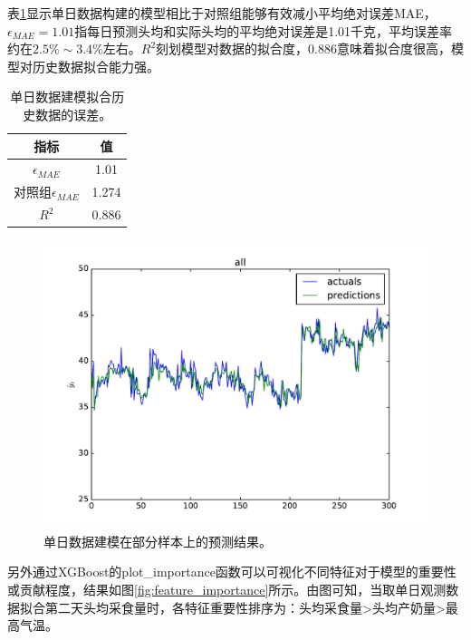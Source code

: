 表\ref{tab:singleday_all}显示单日数据构建的模型相比于对照组能够有效减小平均绝对误差MAE，$\epsilon_{MAE}=1.01$指每日预测头均和实际头均的平均绝对误差是1.01千克，平均误差率约在$2.5\%\sim3.4\%$左右。$R^2$刻划模型对数据的拟合度，0.886意味着拟合度很高，模型对历史数据拟合能力强。

\begin{table}
\caption{单日数据建模拟合历史数据的误差。}
\begin{center}
\footnotesize
\begin{tabular}{|c|c|}
\hline
	指标 & 值\\
\hline
	$\epsilon_{MAE}$  &  1.01\\
	对照组$\epsilon_{MAE}$ & 1.274 \\
	$R^2$  &  0.886 \\
\hline
\end{tabular}
\end{center}
\label{tab:singleday_all}
\end{table}

\begin{figure}
\begin{center}
	\includegraphics[width=0.9\linewidth]{singleday_all}
\caption{单日数据建模在部分样本上的预测结果。}
\label{fig:singleday_all}
\end{center}
\end{figure}

另外通过XGBoost的plot\_importance函数可以可视化不同特征对于模型的重要性或贡献程度，结果如图\ref{fig:feature_importance}所示。由图可知，当取单日观测数据拟合第二天头均采食量时，各特征重要性排序为：头均采食量>头均产奶量>最高气温。

